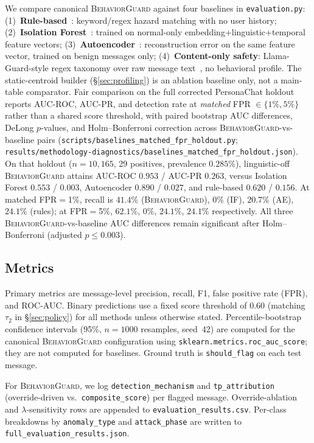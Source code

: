 \documentclass[conference]{IEEEtran}
\newcommand{\BG}{\textsc{BehaviorGuard}}
\begin{document}
We compare canonical \BG{} against four baselines in \texttt{evaluation.py}:
(1)~\textbf{Rule-based}~\cite{owasp2025llm01}: keyword/regex hazard matching with no
user history; (2)~\textbf{Isolation Forest}~\cite{liu2008isolation}: trained on
normal-only embedding+linguistic+temporal feature vectors;
(3)~\textbf{Autoencoder}~\cite{fernandez2024autoencoders}: reconstruction error on the
same feature vector, trained on benign messages only;
(4)~\textbf{Content-only safety}: Llama-Guard-style regex taxonomy over raw message
text~\cite{inan2023llamaguard}, no behavioral profile.
The static-centroid builder (\S\ref{sec:profiling}) is an ablation baseline only, not a
main-table comparator.
Fair comparison on the full corrected PersonaChat holdout reports AUC-ROC, AUC-PR,
and detection rate at \emph{matched} FPR $\in \{1\%, 5\%\}$ rather than a shared
score threshold, with paired bootstrap AUC differences, DeLong $p$-values, and
Holm--Bonferroni correction across \BG{}-vs-baseline pairs
(\texttt{scripts/baselines\_matched\_fpr\_holdout.py};
\texttt{results/methodology-diagnostics/baselines\_matched\_fpr\_holdout.json}).
On that holdout ($n{=}10{,}165$, 29 positives, prevalence $0.285\%$),
linguistic-off \BG{} attains AUC-ROC $0.953$ / AUC-PR $0.263$, versus
Isolation Forest $0.553$ / $0.003$, Autoencoder $0.890$ / $0.027$, and
rule-based $0.620$ / $0.156$.
At matched FPR$=$1\%, recall is $41.4\%$ (\BG{}), $0\%$ (IF), $20.7\%$ (AE),
$24.1\%$ (rules); at FPR$=$5\%, $62.1\%$, $0\%$, $24.1\%$, $24.1\%$ respectively.
All three \BG{}-vs-baseline AUC differences remain significant after
Holm--Bonferroni (adjusted $p \le 0.003$).

\subsection{Metrics}

Primary metrics are message-level precision, recall, F1, false positive rate (FPR),
and ROC-AUC.
Binary predictions use a fixed score threshold of $0.60$ (matching $\tau_2$ in
\S\ref{sec:policy}) for all methods unless otherwise stated.
Percentile-bootstrap confidence intervals (95\%, $n{=}1000$ resamples, seed~42) are
computed for the canonical \BG{} configuration using
\texttt{sklearn.metrics.roc\_auc\_score}; they are not computed for baselines.
Ground truth is \texttt{should\_flag} on each test message.

For \BG{}, we log \texttt{detection\_mechanism} and \texttt{tp\_attribution}
(override-driven vs.\ \texttt{composite\_score}) per flagged message.
Override-ablation and $\lambda$-sensitivity rows are appended to
\texttt{evaluation\_results.csv}.
Per-class breakdowns by \texttt{anomaly\_type} and \texttt{attack\_phase} are written to
\texttt{full\_evaluation\_results.json}.
\end{document}
